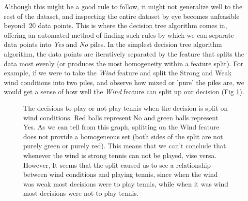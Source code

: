 Although this might be a good rule to follow, it might not generalize well to the rest of the dataset, and inspecting the entire dataset by eye becomes unfeasible beyond $~20$ data points. This is where the decision tree algorithm comes in, offering an automated method of finding such rules by which we can separate data points into \textit{Yes} and \textit{No} piles. In the simplest decision tree algorithm algorithm, the data points are iteratively separated by the feature that splits the data most evenly (or produces the most homogeneity within a feature split). For example, if we were to take the \textit{Wind} feature and split the Strong and Weak wind conditions into two piles, and observe how mixed or 'pure' the piles are, we would get a sense of how well the \textit{Wind} feature can split up our decision (Fig \ref{fig:split_on_wind}).

\begin{figure}
  \centering
    \caption{The decisions to play or not play tennis when the decision is split on wind conditions. Red balls represent No and green balls represent Yes. As we can tell from this graph, splitting on the Wind feature does not provide a homogeneous set (both sides of the split are not purely green or purely red). This means that we can't conclude that whenever the wind is strong tennis can not be played, vise versa. However, It seems that the split caused us to see a relationship between wind conditions and playing tennis, since when the wind was weak most decisions were to play tennis, while when it was wind most decisions were not to play tennis.}
    \label{fig:split_on_wind}
\end{figure}


